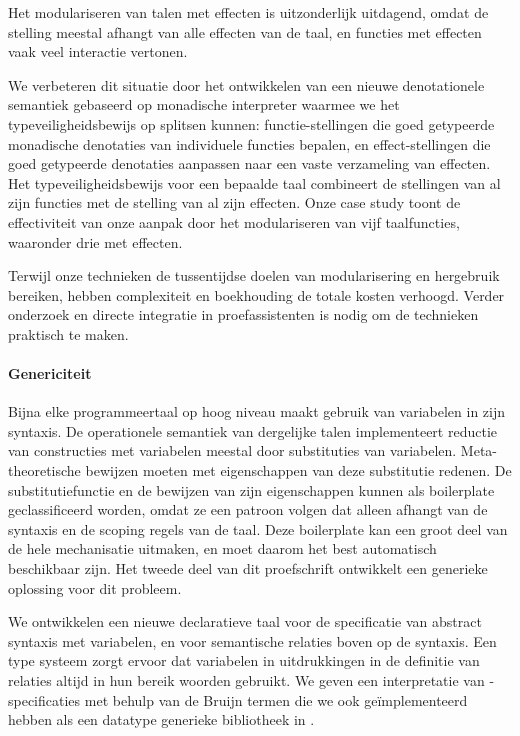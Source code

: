 Het modulariseren van talen met effecten is uitzonderlijk uitdagend, omdat de
stelling meestal afhangt van alle effecten van de taal, en functies met effecten
vaak veel interactie vertonen.

We verbeteren dit situatie door het ontwikkelen van een nieuwe denotationele
semantiek gebaseerd op monadische interpreter waarmee we het
typeveiligheidsbewijs op splitsen kunnen: functie-stellingen die goed getypeerde
monadische denotaties van individuele functies bepalen, en effect-stellingen die
goed getypeerde denotaties aanpassen naar een vaste verzameling van effecten.
Het typeveiligheidsbewijs voor een bepaalde taal combineert de stellingen van
al zijn functies met de stelling van al zijn effecten. Onze case study toont de
effectiviteit van onze aanpak door het modulariseren van vijf taalfuncties,
waaronder drie met effecten.

Terwijl onze technieken de tussentijdse doelen van modularisering en hergebruik
bereiken, hebben complexiteit en boekhouding de totale kosten verhoogd. Verder
onderzoek en directe integratie in proefassistenten is nodig om de technieken
praktisch te maken.


\paragraph{Genericiteit}
Bijna elke programmeertaal op hoog niveau maakt gebruik van variabelen in zijn
syntaxis. De operationele semantiek van dergelijke talen implementeert reductie
van constructies met variabelen meestal door substituties van variabelen.
Meta-theoretische bewijzen moeten met eigenschappen van deze substitutie
redenen. De substitutiefunctie en de bewijzen van zijn eigenschappen kunnen als
boilerplate geclassificeerd worden, omdat ze een patroon volgen dat alleen
afhangt van de syntaxis en de scoping regels van de taal. Deze boilerplate kan
een groot deel van de hele mechanisatie uitmaken, en moet daarom het best
automatisch beschikbaar zijn. Het tweede deel van dit proefschrift ontwikkelt
een generieke oplossing voor dit probleem.

We ontwikkelen een nieuwe declaratieve taal \Knot voor de specificatie van
abstract syntaxis met variabelen, en voor semantische relaties boven op de
syntaxis. Een type systeem zorgt ervoor dat variabelen in uitdrukkingen in de
definitie van relaties altijd in hun bereik woorden gebruikt. We geven een
interpretatie van \Knot-specificaties met behulp van de Bruijn termen die we ook
geïmplementeerd hebben als een datatype generieke bibliotheek \Loom in \Coq.

